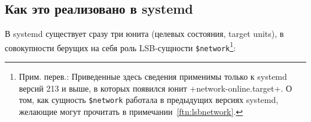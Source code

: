 \documentclass[10pt,oneside,a4paper]{article}
\begin{document}
\begin{comment}
Если же такое вариант вас не~устраивает, вы можете подготовить собственный
service-файл, запускающий любую заданную вами программу или скрипт. Не~забудьте
указать, что он должен быть запущен до достижения цели +network.target+ (при
помощи параметра +Before=+). Кроме того, стоит указать зависимость от
+network.target+ при помощи директивы +Wants=+\footnote{Прим. перев.: Также
не~стоит забывать, что ваша служба сама должна быть кем-то активирована. Это
определяется параметром +WantedBy=+ или +RequiredBy=+ секции +[Install]+. Проще
всего указать здесь ту же самую +network.target+: в результате, ваша служба и
+network.target+ будут взаимно зависеть друг от друга, но при этом
+network.target+ будет активирована только после того, как отработает ваша
служба (о разницы между +WantedBy=+ и +RequiredBy=+ см.
примечание~\ref{ftn:wants}). В качестве основы вы можете взять
\href{http://cgit.freedesktop.org/NetworkManager/NetworkManager/tree/data/NetworkManager-wait-online.service.in}%
{апстримный файл} +NetworkManager-wait-online.service+. В завершение,
не~забудьте выполнить для своей службы +systemctl enable+.}.

\end{comment}


\subsection{Как это реализовано в systemd}

В systemd существует сразу три юнита (целевых состояния, target units), в
совокупности берущих на себя роль LSB-сущности \verb+$network+\footnote{Прим.
перев.: Приведенные здесь сведения применимы только к systemd версий 213 и выше,
в которых появился юнит +network-online.target+. О том, как сущность
\verb+$network+ работала в предыдущих версиях systemd, желающие могут
прочитать в примечании~\ref{ftn:lsbnetwork}.}:
\end{document}
